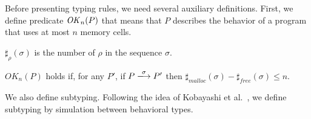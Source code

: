 


Before presenting typing rules, we need several auxiliary definitions.
First, we define predicate \(\mathit{OK}_n(P)\) that means that \(P\)
describes the behavior of a program that uses at most \(n\) memory
cells.

\begin{myDef}[\(\sharp_{\rho}(\sigma)\)]
 \label{df:sharf}
\(\sharp_{\rho}(\sigma)\) is the number of \(\rho\) in the sequence
\(\sigma\).
\end{myDef}


\begin{myDef}
\label{df:okn}
\(OK_{n}(P)\) holds if, for any \(P'\), if \(P
\xlongrightarrow{\sigma}P'\) then
\(\sharp_{malloc}(\sigma)-\sharp_{free}(\sigma)\le n\).
\end{myDef}

We also define subtyping.  Following the idea of Kobayashi et
al.~\cite{}, we define subtyping by simulation between behavioral
types.


